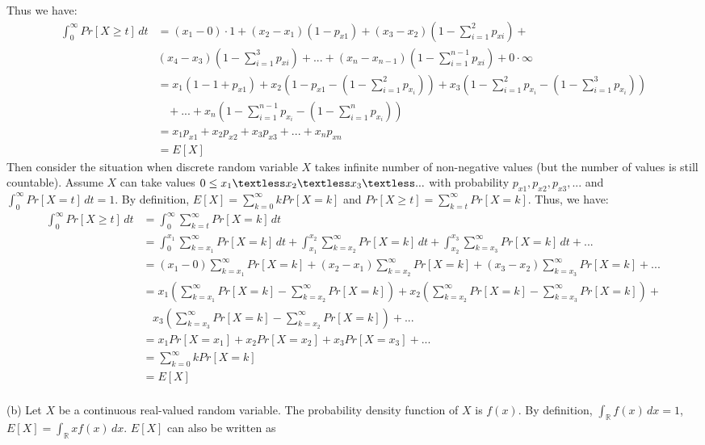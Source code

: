 Thus we have:
\begin{align}
  \nonumber\int_{0}^{\infty}Pr[X\ge t]\, dt &= (x_1-0)\cdot 1+(x_2-x_1) (1-p_{x1})+(x_3-x_2) (1-\sum_{i=1}^{2}p_{xi})+\\
  \nonumber&(x_4-x_3) (1-\sum_{i=1}^{3}p_{xi})+...+(x_n-x_{n-1})(1-\sum_{i=1}^{n-1}p_{xi})+0\cdot \infty\\
  \nonumber&=x_1(1-1+p_{x1})+x_2(1-p_{x1}-(1-\sum_{i=1}^2p_{x_i}))+x_3(1-\sum_{i=1}^2p_{x_i}-(1-\sum_{i=1}^3p_{x_i}))\\
  \nonumber&~~~~+...+x_n(1-\sum_{i=1}^{n-1}p_{x_i}-(1-\sum_{i=1}^np_{x_i}))\\
  \nonumber&=x_1p_{x1}+x_2p_{x2}+x_3p_{x3}+...+x_np_{xn}\\
  \nonumber&=E[X]
\end{align}
Then consider the situation when discrete random variable $X$ takes infinite number of non-negative values (but the number of values is still countable).
Assume $X$ can take values $0\le x_1\textless x_2 \textless x_3 \textless ...$ with probability $p_{x1},p_{x2},p_{x3},...$ and $\int_{0}^{\infty}Pr[X=t]\, dt=1$. By definition, $E[X]=\sum_{k=0}^{\infty}kPr[X=k]$ and $Pr[X\ge t]=\sum_{k=t}^{\infty}Pr[X=k]$. Thus, we have:
\begin{align}
  \nonumber\int_{0}^{\infty}Pr[X\ge t]\, dt &=\int_{0}^{\infty}\sum_{k=t}^{\infty}Pr[X=k] \, dt\\
  \nonumber&=\int_{0}^{x_1}\sum_{k=x_1}^{\infty}Pr[X=k] \, dt + \int_{x_1}^{x_2}\sum_{k=x_2}^{\infty}Pr[X=k] \, dt + \int_{x_2}^{x_3}\sum_{k=x_3}^{\infty}Pr[X=k] \, dt +...\\
  \nonumber&=(x_1-0)\sum_{k=x_1}^{\infty}Pr[X=k]+(x_2-x_1)\sum_{k=x_2}^{\infty}Pr[X=k]+(x_3-x_2)\sum_{k=x_3}^{\infty}Pr[X=k]+...\\
  \nonumber&=x_1(\sum_{k=x_1}^{\infty}Pr[X=k]-\sum_{k=x_2}^{\infty}Pr[X=k])+x_2(\sum_{k=x_2}^{\infty}Pr[X=k]-\sum_{k=x_3}^{\infty}Pr[X=k])+\\
  \nonumber&~~~~ x_3(\sum_{k=x_3}^{\infty}Pr[X=k]-\sum_{k=x_2}^{\infty}Pr[X=k])+...\\
  \nonumber&=x_1Pr[X=x_1]+x_2Pr[X=x_2]+x_3Pr[X=x_3]+...\\
  \nonumber &=\sum_{k=0}^{\infty}kPr[X=k]\\
  \nonumber &=E[X]
\end{align}
\\
(b)
Let $X$ be a continuous real-valued random variable. The probability density function of $X$ is $f(x)$. By definition, $\int_{\mathbb{R}}f(x)\, dx=1$, $E[X]=\int_{\mathbb{R}}xf(x)\, dx$. $E[X]$ can also be written as
